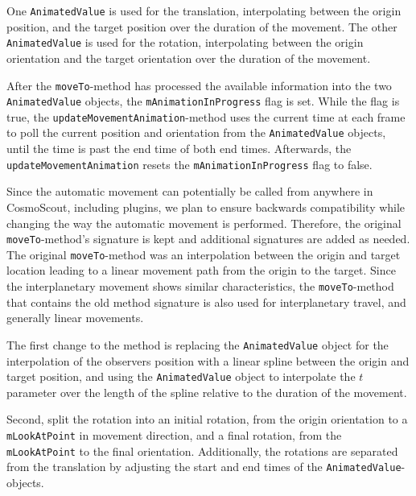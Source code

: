 One \texttt{AnimatedValue} is used for the translation, interpolating between the origin
position, and the target position over the duration of the movement.
The other \texttt{AnimatedValue} is used for the rotation, interpolating between the origin orientation and the
target orientation over the duration of the movement.

After the \texttt{moveTo}-method has processed the available information into the two
\texttt{AnimatedValue} objects, the \texttt{mAnimationInProgress} flag is set.
While the flag is true, the \texttt{updateMovementAnimation}-method uses the current time at each frame to
poll the current position and orientation from the \texttt{AnimatedValue} objects, until the time is past the
end time of both end times.
Afterwards, the \texttt{updateMovementAnimation} resets the \texttt{mAnimationInProgress} flag to false.

Since the automatic movement can potentially be called from anywhere in CosmoScout, including plugins, we plan to
ensure backwards compatibility while changing the way the automatic movement is performed.
Therefore, the original \texttt{moveTo}-method's signature is kept and additional signatures are added as needed.
The original \texttt{moveTo}-method was an interpolation between the origin and target location leading to a
linear movement path from the origin to the target.
Since the interplanetary movement shows similar characteristics, the \texttt{moveTo}-method that contains the old
method signature is also used for interplanetary travel, and generally linear movements.

The first change to the method is replacing the \texttt{AnimatedValue} object for the interpolation of the
observers position with a linear spline between the origin and target position, and using the
\texttt{AnimatedValue} object to interpolate the $t$ parameter over the length of the spline relative to the
duration of the movement.

Second, split the rotation into an initial rotation, from the origin orientation to a \texttt{mLookAtPoint} in
movement direction, and a final rotation, from the \texttt{mLookAtPoint} to the final orientation.
Additionally, the rotations are separated from the translation by adjusting the start and end times of the
\texttt{AnimatedValue}-objects.

